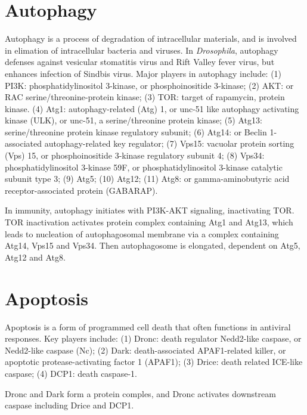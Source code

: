 \documentclass[11pt]{article}
\begin{document}
\begin{sloppypar}
\section*{Autophagy}
Autophagy is a process of degradation of intracellular materials, and is involved in elimation of intracellular bacteria and viruses. 
In \textit{Drosophila}, autophagy defenses against vesicular stomatitis virus and Rift Valley fever virus, but enhances infection of Sindbis virus. 
Major players in autophagy include: 
\newline
(1) PI3K: phosphatidylinositol 3-kinase, or phosphoinositide 3-kinase; \newline
(2) AKT: or RAC serine/threonine-protein kinase; \newline
(3) TOR: target of rapamycin, protein kinase. \newline
(4) Atg1: autophagy-related (Atg) 1, or unc-51 like autophagy activating kinase (ULK), or unc-51, a serine/threonine protein kinase; \newline
(5) Atg13: serine/threonine protein kinase regulatory subunit; \newline
(6) Atg14: or Beclin 1-associated autophagy-related key regulator; \newline
(7) Vps15: vacuolar protein sorting (Vps) 15, or phosphoinositide 3-kinase regulatory subunit 4; \newline
(8) Vps34: phosphatidylinositol 3-kinase 59F, or phosphatidylinositol 3-kinase catalytic subunit type 3; \newline
(9) Atg5; \newline
(10) Atg12; \newline
(11) Atg8: or gamma-aminobutyric acid receptor-associated protein (GABARAP). 

\par

In immunity, autophagy initiates with PI3K-AKT signaling, inactivating TOR. 
TOR inactivation activates protein complex containing Atg1 and Atg13, which leads to nucleation of autophagosomal membrane via a complex containing Atg14, Vps15 and Vps34. 
Then autophagosome is elongated, dependent on Atg5, Atg12 and Atg8.

\section*{Apoptosis}
Apoptosis is a form of programmed cell death that often functions in antiviral responses. 
Key players include: 
\newline
(1) Dronc: death regulator Nedd2-like caspase, or Nedd2-like caspase (Nc); \newline
(2) Dark: death-associated APAF1-related killer, or apoptotic protease-activating factor 1 (APAF1); \newline
(3) Drice: death related ICE-like caspase; \newline
(4) DCP1: death caspase-1. 

\par

Dronc and Dark form a protein comples, and Dronc activates downstream caspase including Drice and DCP1.

\end{sloppypar}
\end{document}
